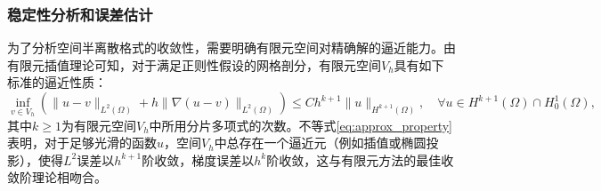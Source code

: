 \documentclass{GZUbachelorthesis}
\theoremstyle{chineseplain}
\begin{document}
\subsubsection{稳定性分析和误差估计}
为了分析空间半离散格式的收敛性，需要明确有限元空间对精确解的逼近能力。由有限元插值理论可知，对于满足正则性假设的网格剖分，有限元空间$V_h$具有如下标准的逼近性质\cite{Wang2004}：
\begin{equation}\label{eq:approx_property}
	\inf_{v \in V_h} \left( \|u - v\|_{L^2(\Omega)} + h \|\nabla(u - v)\|_{L^2(\Omega)} \right) \leq C h^{k+1} \|u\|_{H^{k+1}(\Omega)}, \quad \forall u\in H^{k+1}(\Omega) \cap H^1_0(\Omega),
\end{equation}
其中$k \geq1$为有限元空间$V_h$中所用分片多项式的次数。不等式\eqref{eq:approx_property}表明，对于足够光滑的函数$u$，空间$V_h$中总存在一个逼近元（例如插值或椭圆投影），使得$L^2$误差以$h^{k+1}$阶收敛，梯度误差以$h^{k}$阶收敛，这与有限元方法的最佳收敛阶理论相吻合。
\end{document}
